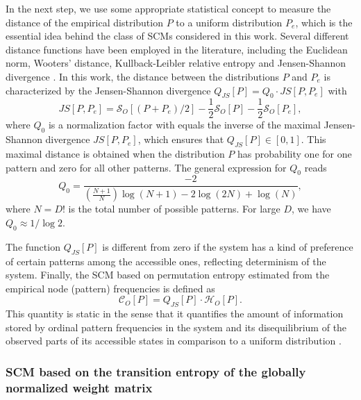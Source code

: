 \documentclass[12pt,aip,cha,reprint,nofootinbib]{revtex4-1}
\begin{document}
In the next step, we use some appropriate statistical concept to measure the distance of the empirical distribution $P$ to a uniform distribution $P_e$, which is the essential idea behind the class of SCMs considered in this work. Several different distance functions have been employed in the literature, including the Euclidean norm, Wooters' distance, Kullback-Leibler relative entropy and Jensen-Shannon divergence \cite{kowalskiEntropy2011}. In this work, the distance between the distributions $P$ and $P_e$ is characterized by the Jensen-Shannon divergence $Q_{JS}[P] = Q_0 \cdot JS[P, P_e]$ with 
\begin{equation}
JS[P, P_e] = \mathcal{S}_O[(P+P_e)/2] - \frac{1}{2}\mathcal{S}_O[P] - \frac{1}{2}\mathcal{S}_O[P_e], 
\end{equation}
where $Q_0$ is a normalization factor with equals the inverse of the maximal Jensen-Shannon divergence $JS[P, P_e]$, which ensures that $Q_{JS}[P] \in [0, 1]$. This maximal distance is obtained when the distribution $P$ has probability one for one pattern and zero for all other patterns. The general expression for $Q_0$ reads  
\begin{equation} \label{eq:Q0}
Q_0 = \frac{-2}{\left(\frac{N+1}{N}\right) \log (N+1) -2 \log (2N) + \log (N)},
\end{equation}
where $N = D!$ is the total number of possible patterns. For large $D$, we have $Q_0 \approx 1 /  \log 2$. 

The function $Q_{JS}[P]$ is different from zero if the system has a kind of preference of certain patterns among the accessible ones, reflecting determinism of the system. Finally, the SCM based on permutation entropy estimated from the empirical node (pattern) frequencies is defined as 
\begin{equation}
\mathcal{C}_{O}[P] = Q_{JS}[P] \cdot \mathcal{H}_{O}[P].
\end{equation}
This quantity is static in the sense that it quantifies the amount of information stored by ordinal pattern frequencies in the system and its disequilibrium of the observed parts of its accessible states in comparison to a uniform distribution \cite{LopezPLA1995}. 

\subsubsection{SCM based on the transition entropy of the globally normalized weight matrix} 
\end{document}
